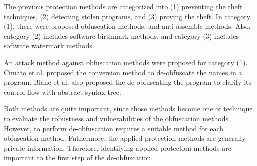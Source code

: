 \documentclass[conference]{IEEEtran}
\begin{document}
The previous protection methods are categorized into (1) preventing
the theft techniques, (2) detecting stolen programs, and (3) proving
the theft\cite{collberg09surreptitious}.
%
In category (1), there were proposed obfuscation methods, and
anti-assemble methods\cite{tyma00patent,monden97ieice}.  Also,
category (2) includes software birthmark
methods\cite{tamada05ieice}, and category (3) includes software
watermark methods\cite{collberg99popl}.

An attack method against obfuscation methods were proposed for
category (1)\cite{cimato05jss}.
%
Cimato et al. proposed the conversion method to de-obfuscate the names
in a program.
%
Blanc et al. also proposed the de-obfuscating the program to clarify
its control flow with abstract syntax tree\cite{preda06amast}.

Both methods are quite important, since those methods become one of
technique to evaluate the robustness and vulnerabilities of the
obfuscation methods.  However, to perform de-obfuscation requires a
suitable method for each obfuscation method.  Futhermore, the applied
protection methods are generally private information.  Therefore,
identifying applied protection methods are important to the first step
of the de-obfuscation.

% 
\end{document}
